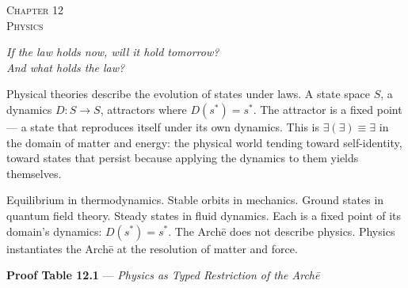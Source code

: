 \documentclass[10pt, openany, oneside]{book}
\renewcommand{\large}{\fontsize{11.5}{14}\selectfont}
\renewcommand{\huge}{\fontsize{17}{21}\selectfont}
\begin{document}
\newpage

\begin{center}
    {\huge\scshape Chapter 12}\\[0.3em]
    {\large\scshape Physics}
\end{center}

\vspace{1.5em}

\begin{center}
    \itshape
    If the law holds now, will it hold tomorrow?\\
    And what holds the law?
\end{center}

\vspace{2em}


\noindent Physical theories describe the evolution of states under laws. A state space $S$, a dynamics $D: S \to S$, attractors where $D(s^*) = s^*$. The attractor is a fixed point --- a state that reproduces itself under its own dynamics. This is $\exists(\exists) \equiv \exists$ in the domain of matter and energy: the physical world tending toward self-identity, toward states that persist because applying the dynamics to them yields themselves.

Equilibrium in thermodynamics. Stable orbits in mechanics. Ground states in quantum field theory. Steady states in fluid dynamics. Each is a fixed point of its domain's dynamics: $D(s^*) = s^*$. The Arch\={e} does not describe physics. Physics instantiates the Arch\={e} at the resolution of matter and force.

\vspace{0.5em}

\textbf{Proof Table 12.1} --- \textit{Physics as Typed Restriction of the Arch\={e}}

\vspace{0.5em}
\end{document}
